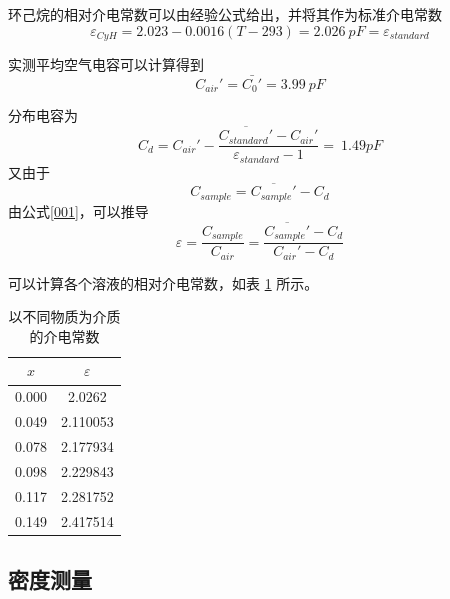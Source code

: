\documentclass[cn,hazy,pku,12pt,normal,math=newtx,cite=super]{elegantnote}
\begin{document}
环己烷的相对介电常数可以由经验公式给出，并将其作为标准介电常数
\begin{equation}
    \varepsilon_{CyH} =  2.023 - 0.0016 ( T - 293 ) = 2.026\ pF = \varepsilon_{standard}
\end{equation}

实测平均空气电容可以计算得到
$$
C_{air}'= \bar{C_0'} = 3.99\ pF
$$

分布电容为
\begin{equation}
    C_{d} = C_{air}'-\frac{\overline{C_{standard}'}-C_{air}'}{\varepsilon_{standard} - 1} =\ 1.49 pF
\end{equation}
又由于
\begin{equation}\label{001}
    C_{sample} = \overline{C_{sample}'}-C_d
\end{equation}
由公式\ref{001}，可以推导
\begin{equation}
    \varepsilon = \frac{C_{sample}}{C_{air}} = \frac{\overline{C_{sample}'}-C_d}{C_{air}' - C_d}
\end{equation}

可以计算各个溶液的相对介电常数，如表 \ref{03} 所示。

\begin{table}[h]
    \centering
    \caption{以不同物质为介质的介电常数}
    \label{03}
    \begin{tabular}{cc}
    \hline
    $x$   & $\varepsilon$ \\ \hline
    0.000 & 2.0262        \\
    0.049 & 2.110053      \\
    0.078 & 2.177934      \\
    0.098 & 2.229843      \\
    0.117 & 2.281752      \\
    0.149 & 2.417514      \\ \hline
    \end{tabular}
\end{table}

\subsection{密度测量}
\end{document}

